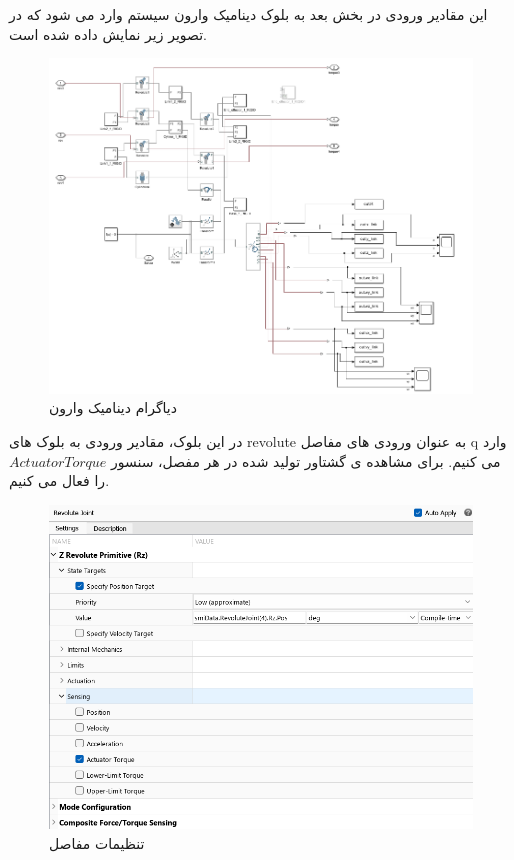این مقادیر ورودی در بخش بعد به بلوک دینامیک وارون سیستم وارد می شود که در تصویر زیر نمایش داده شده است.
\begin{figure}[H]
	\centering
	\includegraphics[width=1\linewidth]{../img/3}
	\caption{دیاگرام دینامیک وارون}
	\label{fig:3}
\end{figure}
در این بلوک، مقادیر ورودی به بلوک های revolute به عنوان ورودی های مفاصل q وارد می کنیم.
برای مشاهده ی گشتاور تولید شده در هر مفصل، سنسور $Actuator Torque$ را فعال می کنیم.
\begin{figure}[H]
	\centering
	\includegraphics[width=1\linewidth]{../img/4}
	\caption{تنظیمات مفاصل}
	\label{fig:4}
\end{figure}
